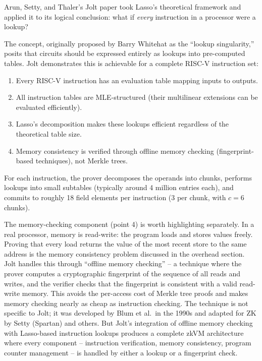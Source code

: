 \documentclass[
  11pt,
  openany]{report}
\providecommand{\tightlist}{%
  \setlength{\itemsep}{0pt}\setlength{\parskip}{0pt}}
\begin{document}
Arun, Setty, and Thaler's Jolt paper took Lasso's theoretical framework and
applied it to its logical conclusion: what if \emph{every} instruction in a
processor were a lookup?

The concept, originally proposed by Barry Whitehat as the ``lookup
singularity,'' posits that circuits should be expressed entirely as lookups into
pre-computed tables. Jolt demonstrates this is achievable for a complete RISC-V
instruction set:

\begin{enumerate}
\def\labelenumi{\arabic{enumi}.}
\tightlist
\item
  Every RISC-V instruction has an evaluation table mapping inputs to outputs.
\item
  All instruction tables are MLE-structured (their multilinear extensions can be
  evaluated efficiently).
\item
  Lasso's decomposition makes these lookups efficient regardless of the
  theoretical table size.
\item
  Memory consistency is verified through offline memory checking
  (fingerprint-based techniques), not Merkle trees.
\end{enumerate}

For each instruction, the prover decomposes the operands into chunks, performs
lookups into small subtables (typically around 4 million entries each), and
commits to roughly 18 field elements per instruction (3 per chunk, with
\(c = 6\) chunks).

The memory-checking component (point 4) is worth highlighting separately. In a
real processor, memory is read-write: the program loads and stores values
freely. Proving that every load returns the value of the most recent store to
the same address is the memory consistency problem discussed in the overhead
section. Jolt handles this through ``offline memory checking'' -- a technique
where the prover computes a cryptographic fingerprint of the sequence of all
reads and writes, and the verifier checks that the fingerprint is consistent
with a valid read-write memory. This avoids the per-access cost of Merkle tree
proofs and makes memory checking nearly as cheap as instruction checking. The
technique is not specific to Jolt; it was developed by Blum et al.~in the 1990s
and adapted for ZK by Setty (Spartan) and others. But Jolt's integration of
offline memory checking with Lasso-based instruction lookups produces a complete
zkVM architecture where every component -- instruction verification, memory
consistency, program counter management -- is handled by either a lookup or a
fingerprint check.
\end{document}
